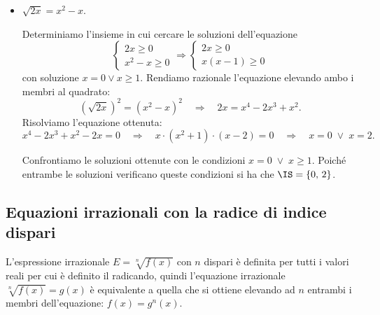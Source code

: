 \begin{exrig}
\begin{esempio}
\begin{itemize}
\item $\sqrt{2x}=x^2-x$.

Determiniamo l'insieme in cui cercare le soluzioni dell'equazione 
\[\left\{\begin{array}{l}{2x\ge 0}\\{x^2-x\ge 0}\end{array}\right.
\Rightarrow
\left\{\begin{array}{l}{2x\ge 0}\\{x(x-1)\ge 0}\end{array}\right.
\]
con soluzione $x=0\vee x\ge 1$.
Rendiamo razionale l'equazione elevando ambo i membri al quadrato: 
\[\left(\sqrt{2x}\right)^2=\left(x^2-x\right)^2\quad\Rightarrow\quad 2x=x^4-2x^3+x^2.\]
Risolviamo l'equazione ottenuta: 
\[x^4-2x^3+x^2-2x=0\quad\Rightarrow\quad x\cdot \left(x^2+1\right)\cdot (x-2)=0\quad\Rightarrow\quad x=0\;\vee\; x=2.\]

Confrontiamo le soluzioni ottenute con le condizioni $x=0\;\vee\; x\ge 1$. Poiché entrambe le soluzioni verificano queste condizioni si ha che $\IS=\{0\text{, }2\}$.
\end{itemize}
\end{esempio}
\end{exrig}

\subsection{Equazioni irrazionali con la radice di indice dispari}

L'espressione irrazionale $E=\sqrt[n]{f(x)}$ con $n$ dispari è definita per tutti i valori reali per cui è definito il radicando, quindi l'equazione irrazionale $\sqrt[n]{f(x)}=g(x)$ è equivalente a quella che si ottiene elevando ad $n$ entrambi i membri dell'equazione: $f(x)=g^n(x)$.

